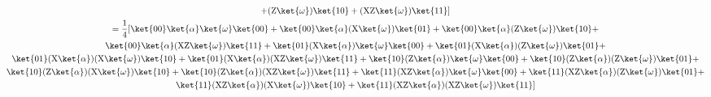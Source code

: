 \documentclass[]{article}
\begin{document}
\begin{enumerate}
\begin{gather*}
          + (\text{Z} \ket{\omega}) \ket{10} + (\text{XZ} \ket{\omega}) \ket{11}]\\
          = \frac{1}{4}[ %
          \ket{00}\ket{\alpha}\ket{\omega}\ket{00} +
          \ket{00}\ket{\alpha}(\text{X} \ket{\omega})\ket{01} +
          \ket{00}\ket{\alpha}(\text{Z} \ket{\omega})\ket{10} + \\
          \ket{00}\ket{\alpha}(\text{XZ} \ket{\omega})\ket{11} +
          \ket{01}(\text{X}\ket{\alpha})\ket{\omega}\ket{00} +
          \ket{01}(\text{X}\ket{\alpha})(\text{Z} \ket{\omega})\ket{01} +\\
          \ket{01}(\text{X}\ket{\alpha})(\text{X} \ket{\omega})\ket{10} +
          \ket{01}(\text{X}\ket{\alpha})(\text{XZ} \ket{\omega})\ket{11} +
          \ket{10}(\text{Z}\ket{\alpha})\ket{\omega}\ket{00} +
          \ket{10}(\text{Z}\ket{\alpha})(\text{Z} \ket{\omega})\ket{01} +\\
          \ket{10}(\text{Z}\ket{\alpha})(\text{X} \ket{\omega})\ket{10} +
          \ket{10}(\text{Z}\ket{\alpha})(\text{XZ} \ket{\omega})\ket{11} +
          \ket{11}(\text{XZ}\ket{\alpha})\ket{\omega}\ket{00} +
          \ket{11}(\text{XZ}\ket{\alpha})(\text{Z} \ket{\omega})\ket{01} +\\
          \ket{11}(\text{XZ}\ket{\alpha})(\text{X} \ket{\omega})\ket{10} +
          \ket{11}(\text{XZ}\ket{\alpha})(\text{XZ} \ket{\omega})\ket{11}
          ] \\
        \end{gather*}


\end{enumerate}
\end{document}
